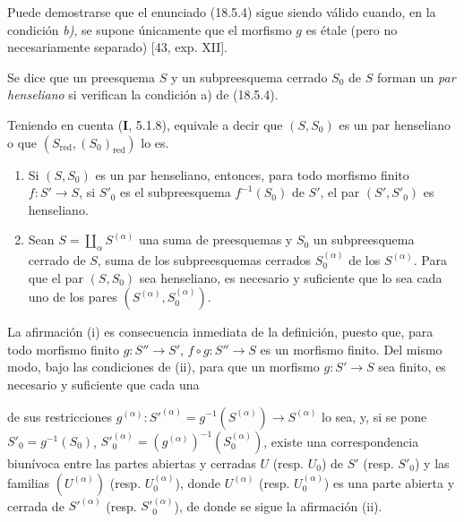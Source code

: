 \begin{remark}[18.5.4.4]
\label{IV.18.5.4.4}
Puede demostrarse que el enunciado (18.5.4) sigue siendo válido cuando, en la condición \emph{b)}, se supone únicamente que el morfismo $g$ es étale (pero no necesariamente separado) [43, exp. XII].
\end{remark}

\begin{definition}[18.5.5]
\label{IV.18.5.5}
Se dice que un preesquema $S$ y un subpreesquema cerrado $S_0$ de $S$ forman un \emph{par henseliano} si verifican la condición \textup{a)} de \textup{(18.5.4)}.
\end{definition}

Teniendo en cuenta (\textbf I, 5.1.8), equivale a decir que $(S,S_0)$ es un par henseliano o que $(S_{\mathrm{red}},(S_0)_{\mathrm{red}})$ lo es.

\begin{proposition}[18.5.6]
\label{IV.18.5.6}
\begin{enumerate}
  \item[\textup{(i)}] Si $(S,S_0)$ es un par henseliano, entonces, para todo morfismo finito $f:S'\to S$, si $S'_0$ es el subpreesquema $f^{-1}(S_0)$ de $S'$, el par $(S',S'_0)$ es henseliano.
  \item[\textup{(ii)}] Sean $S=\coprod_\alpha S^{(\alpha)}$ una suma de preesquemas y $S_0$ un subpreesquema cerrado de $S$, suma de los subpreesquemas cerrados $S_0^{(\alpha)}$ de los $S^{(\alpha)}$. Para que el par $(S,S_0)$ sea henseliano, es necesario y suficiente que lo sea cada uno de los pares $(S^{(\alpha)},S_0^{(\alpha)})$.
\end{enumerate}
\end{proposition}

La afirmación (i) es consecuencia inmediata de la definición, puesto que, para todo morfismo finito $g:S''\to S'$, $f\circ g:S''\to S$ es un morfismo finito. Del mismo modo, bajo las condiciones de (ii), para que un morfismo $g:S'\to S$ sea finito, es necesario y suficiente que cada una


de sus restricciones $g^{(\alpha)}:S'^{(\alpha)}=g^{-1}(S^{(\alpha)})\to S^{(\alpha)}$ lo sea, y, si se pone $S'_0=g^{-1}(S_0)$, $S'^{(\alpha)}_0=(g^{(\alpha)})^{-1}(S^{(\alpha)}_0)$, existe una correspondencia biunívoca entre las partes abiertas y cerradas $U$ (resp. $U_0$) de $S'$ (resp. $S'_0$) y las familias $(U^{(\alpha)})$ (resp. $U^{(\alpha)}_0$), donde $U^{(\alpha)}$ (resp. $U^{(\alpha)}_0$) es una parte abierta y cerrada de $S'^{(\alpha)}$ (resp. $S'^{(\alpha)}_0$), de donde se sigue la afirmación (ii).

